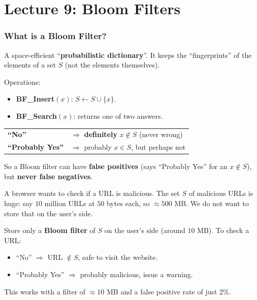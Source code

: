 \documentclass[11pt]{article}
\begin{document}
\part*{\textcolor{utnavy}{Lecture 9: Bloom Filters}}

\section{What is a Bloom Filter?}

\begin{defbox}[\textcolor{defblue}{Bloom Filter (Burton Howard Bloom, 1970)}]
A space-efficient ``\textbf{probabilistic dictionary}''. It keeps the ``fingerprints'' of the elements of a set $S$ (not the elements themselves).

Operations:
\begin{itemize}[leftmargin=1.4em,itemsep=1pt]
  \item \textcolor{heapblue}{\textbf{BF\_Insert}$(x)$}: $S \leftarrow S \cup \{x\}$.
  \item \textcolor{heapblue}{\textbf{BF\_Search}$(x)$}: returns one of two answers.
\end{itemize}
\end{defbox}

\begin{keybox}
\renewcommand{\arraystretch}{1.4}
\begin{tabular}{l l}
\textcolor{greenO}{\textbf{``No''}} & $\Rightarrow$ \textbf{definitely} $x \notin S$ \quad (never wrong)\\
\textcolor{rustW}{\textbf{``Probably Yes''}} & $\Rightarrow$ probably $x \in S$, but perhaps not\\
\end{tabular}
\medskip

So a Bloom filter can have \textbf{\textcolor{rustW}{false positives}} (says ``Probably Yes'' for an $x \notin S$), but \textbf{never false negatives}.
\end{keybox}

\begin{examplebox}
A browser wants to check if a URL is malicious. The set $S$ of malicious URLs is huge: say $10$ million URLs at $50$ bytes each, so $\approx 500$ MB. We do not want to store that on the user's side.

Store only a \textbf{Bloom filter} of $S$ on the user's side (around $10$ MB). To check a URL:
\begin{itemize}[leftmargin=1.4em,itemsep=1pt]
  \item \textcolor{greenO}{``No''} $\Rightarrow$ URL $\notin S$, safe to visit the website.
  \item \textcolor{rustW}{``Probably Yes''} $\Rightarrow$ probably malicious, issue a warning.
\end{itemize}
This works with a filter of $\approx 10$ MB and a false positive rate of just $2\%$.
\end{examplebox}
\end{document}
